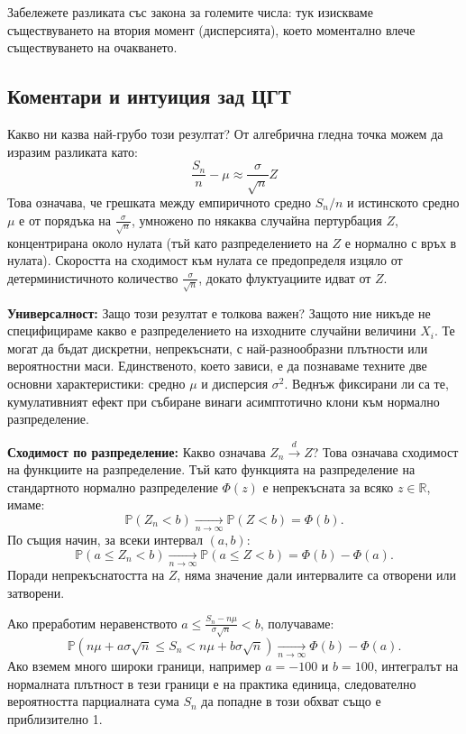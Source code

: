 Забележете разликата със закона за големите числа: тук изискваме съществуването на втория момент (дисперсията), което моментално влече съществуването на очакването.

\subsection{Коментари и интуиция зад ЦГТ}

Какво ни казва най-грубо този резултат? От алгебрична гледна точка можем да изразим разликата като:
\[ \frac{S_n}{n} - \mu \approx \frac{\sigma}{\sqrt{n}} Z \]
Това означава, че грешката между емпиричното средно $S_n/n$ и истинското средно $\mu$ е от порядъка на $\frac{\sigma}{\sqrt{n}}$, умножено по някаква случайна пертурбация $Z$, концентрирана около нулата (тъй като разпределението на $Z$ е нормално с връх в нулата). Скоростта на сходимост към нулата се предопределя изцяло от детерминистичното количество $\frac{\sigma}{\sqrt{n}}$, докато флуктуациите идват от $Z$.

\textbf{Универсалност:} Защо този резултат е толкова важен? Защото ние никъде не специфицираме какво е разпределението на изходните случайни величини $X_i$. Те могат да бъдат дискретни, непрекъснати, с най-разнообразни плътности или вероятностни маси. Единственото, което зависи, е да познаваме техните две основни характеристики: средно $\mu$ и дисперсия $\sigma^2$. Веднъж фиксирани ли са те, кумулативният ефект при събиране винаги асимптотично клони към нормално разпределение.

\textbf{Сходимост по разпределение:} Какво означава $Z_n \xrightarrow{d} Z$? Това означава сходимост на функциите на разпределение. Тъй като функцията на разпределение на стандартното нормално разпределение $\Phi(z)$ е непрекъсната за всяко $z \in \mathbb{R}$, имаме:
\[ \mathbb{P}(Z_n < b) \xrightarrow[n \to \infty]{} \mathbb{P}(Z < b) = \Phi(b). \]
По същия начин, за всеки интервал $(a, b)$:
\[ \mathbb{P}(a \le Z_n < b) \xrightarrow[n \to \infty]{} \mathbb{P}(a \le Z < b) = \Phi(b) - \Phi(a). \]
Поради непрекъснатостта на $Z$, няма значение дали интервалите са отворени или затворени.

Ако преработим неравенството $a \le \frac{S_n - n\mu}{\sigma\sqrt{n}} < b$, получаваме:
\[ \mathbb{P}\left( n\mu + a\sigma\sqrt{n} \le S_n < n\mu + b\sigma\sqrt{n} \right) \xrightarrow[n \to \infty]{} \Phi(b) - \Phi(a). \]
Ако вземем много широки граници, например $a = -100$ и $b = 100$, интегралът на нормалната плътност в тези граници е на практика единица, следователно вероятността парциалната сума $S_n$ да попадне в този обхват също е приблизително 1.

